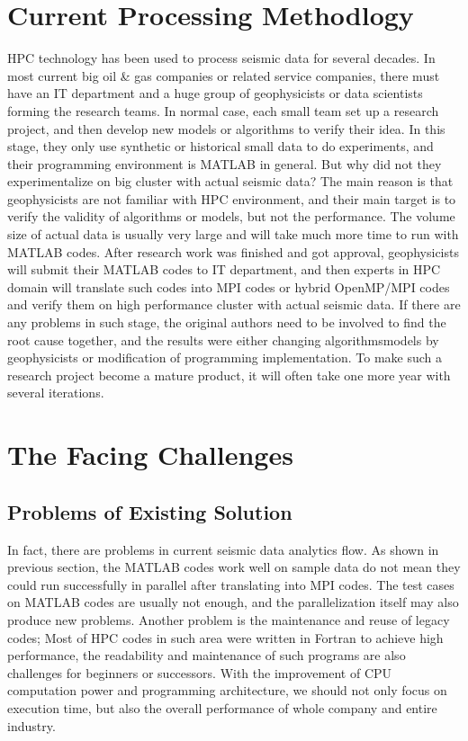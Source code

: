 \section{Current Processing Methodlogy}
HPC technology has been used to process seismic data for several decades. In most current big oil \& gas companies or related service companies, there must have an IT department and a huge group of geophysicists or data scientists forming the research teams. In normal case, each small team set up a research project, and then develop new models or algorithms to verify their idea. In this stage, they only use synthetic or historical small data to do experiments, and their programming environment is MATLAB in general. But why did not they experimentalize on big cluster with actual seismic data? The main reason is that geophysicists are not familiar with HPC environment, and their main target is to verify the validity of algorithms or models, but not the performance. The volume size of actual data is usually very large and will take much more time to run with MATLAB codes. After research work was finished and got approval, geophysicists will submit their MATLAB codes to IT department, and then experts in HPC domain will translate such codes into MPI codes or hybrid OpenMP/MPI codes and verify them on high performance cluster with actual seismic data. If there are any problems in such stage, the original authors need to be involved to find the root cause together, and the results were either changing algorithms\/models by geophysicists or modification of programming implementation. To make such a research project become a mature product, it will often take one more year with several iterations.



\section{The Facing Challenges}

\subsection{Problems of Existing Solution}
In fact, there are problems in current seismic data analytics flow. As shown in previous section, the MATLAB codes work well on sample data do not mean they could run successfully in parallel after translating into MPI codes. The test cases on MATLAB codes are usually not enough, and the parallelization itself may also produce new problems.
Another problem is the maintenance and reuse of legacy codes; Most of HPC codes in such area were written in Fortran to achieve high performance, the readability and maintenance of such programs are also challenges for beginners or successors. With the improvement of CPU computation power and programming architecture, we should not only focus on execution time, but also the overall performance of whole company and entire industry. 

